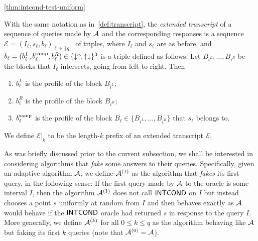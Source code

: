 \begin{proofof}{\cref{thm:intcond-test-uniform}}
\begin{definition}\label{def:extended:transcript}  With the same notation
as in~\cref{def:transcript}, the \emph{extended transcript} of a
sequence of queries made by $\mathcal{A}$ and the corresponding responses
is a sequence
$\mathcal{E}=(I_\ell, s_\ell, b_\ell)_{\ell \in [q]}$ of triples,
where $I_\ell$ and $s_\ell$ are as before, and
$b_\ell = (b_\ell^L,b_\ell^{\rm samp},b_\ell^R) \in\{\downarrow\uparrow,
\uparrow\downarrow\}^3$ is a triple defined as follows:
Let $B_{i^L},\dots,B_{i^R}$ be the blocks that $I_\ell$ intersects, going from
left to right.  Then
\begin{enumerate}
\item $b_\ell^L$ is the profile of the block $B_{i^L}$;
\item $b_\ell^R$ is the profile of the block $B_{i^R}$;
\item $b_\ell^{\rm samp}$ is the profile of the block $B_\ell \in \{B_{i^L},\dots,B_{i^R}\}$
that $s_\ell$ belongs to.
\end{enumerate}
We define $\mathcal{E}|_k$ to be the length-$k$ prefix of an
extended transcript $\mathcal{E}$.
\end{definition}


As was briefly discussed prior to the current subsection, we shall  be interested
in considering algorithms that \emph{fake} some answers to their queries.
Specifically,
given an adaptive algorithm $\mathcal{A}$,
we define $\mathcal{A}^{(1)}$ as the algorithm that \emph{fakes} its first query,
in the following sense: If the first query made by $\mathcal{A}$ to the oracle is
some interval $I$, then the algorithm $\mathcal{A}^{(1)}$
does not call ${\sf INTCOND}$ on $I$ but instead
chooses a point $s$ uniformly at random from $I$ and then behaves exactly as
$\mathcal{A}$ would behave if the ${\sf INTCOND}$ oracle had returned $s$ in response
to the query $I$.
More generally, we define $\mathcal{A}^{(k)}$ for all $0 \leq k \leq q$
as the algorithm behaving like $\mathcal{A}$ but faking its first $k$
queries (note that $\mathcal{A}^{(0)}=\mathcal{A}$).


\end{proofof}
